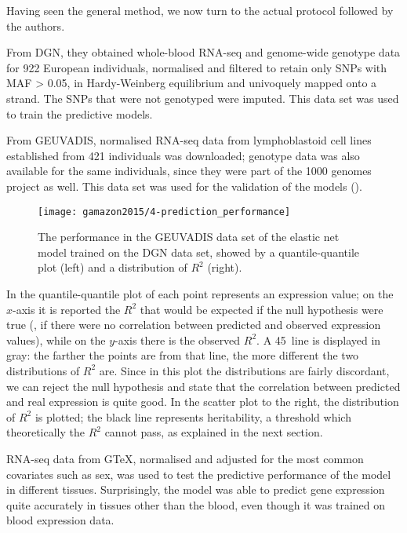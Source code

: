 \documentclass[../main.tex]{subfiles}
\begin{document}
Having seen the general method, we now turn to the actual protocol 
followed by the authors.

From DGN, they obtained whole-blood RNA-seq and genome-wide genotype 
data for 922 European individuals, normalised and filtered to retain 
only SNPs with MAF > 0.05, in Hardy-Weinberg equilibrium and univoquely 
mapped onto a strand. The SNPs that were not genotyped were 
imputed. This data set was used to train the predictive models.

From GEUVADIS, normalised RNA-seq data from lymphoblastoid cell lines 
established from 421 individuals was downloaded; genotype data was also 
available for the same individuals, since they were part of the 1000 
genomes project as well. This data set was used for the validation of 
the models ().

\begin{figure}
	\texttt{[image: gamazon2015/4-prediction\_performance]}
	\caption{The performance in the GEUVADIS data set of the elastic net 
model trained on the DGN data set, showed by a quantile-quantile plot 
(left) and a distribution of $R^2$ (right).}
\end{figure}

In the quantile-quantile plot of  each point 
represents an expression value; on the $x$-axis it is reported the $R^2$ 
that would be expected if the null hypothesis were true (\ie, if there 
were no correlation between predicted and observed expression values), 
while on the $y$-axis there is the observed $R^2$. A 45\textdegree\ line 
is displayed in gray: the farther the points are from that line, the 
more different the two distributions of $R^2$ are. Since in this plot 
the distributions are fairly discordant, we can reject the null 
hypothesis and state that the correlation between predicted and real 
expression is quite good. In the scatter plot to the right, the 
distribution of $R^2$ is plotted; the black line represents 
heritability, a threshold which theoretically the $R^2$ cannot pass, as 
explained in the next section.

RNA-seq data from GTeX, normalised and adjusted for the most common 
covariates such as sex, was used to test the predictive performance of 
the model in different tissues. Surprisingly, the model was able to 
predict gene expression quite accurately in tissues other than the 
blood, even though it was trained on blood expression data.
\end{document}
